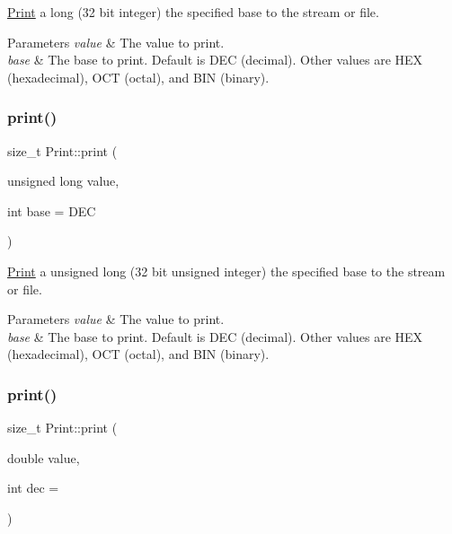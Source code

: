 \mbox{\hyperlink{class_print}{Print}} a long (32 bit integer) the specified base to the stream or file. 


\begin{DoxyParams}{Parameters}
{\em value} & The value to print. \\
\hline
{\em base} & The base to print. Default is D\+EC (decimal). Other values are H\+EX (hexadecimal), O\+CT (octal), and B\+IN (binary). \\
\hline
\end{DoxyParams}
\mbox{\label{class_print_acb8c6dcd4339b024436002aa9a6f4be2}} 
\subsubsection{\texorpdfstring{print()}{print()}\hspace{0.1cm}{\footnotesize\ttfamily [5/6]}}
{\footnotesize\ttfamily size\+\_\+t Print\+::print (\begin{DoxyParamCaption}\item[{unsigned long}]{value,  }\item[{int}]{base = {\ttfamily DEC} }\end{DoxyParamCaption})}



\mbox{\hyperlink{class_print}{Print}} a unsigned long (32 bit unsigned integer) the specified base to the stream or file. 


\begin{DoxyParams}{Parameters}
{\em value} & The value to print. \\
\hline
{\em base} & The base to print. Default is D\+EC (decimal). Other values are H\+EX (hexadecimal), O\+CT (octal), and B\+IN (binary). \\
\hline
\end{DoxyParams}
\mbox{\label{class_print_ad89472bdb6539423a42d350beec02ff4}} 
\subsubsection{\texorpdfstring{print()}{print()}\hspace{0.1cm}{\footnotesize\ttfamily [6/6]}}
{\footnotesize\ttfamily size\+\_\+t Print\+::print (\begin{DoxyParamCaption}\item[{double}]{value,  }\item[{int}]{dec = {} }\end{DoxyParamCaption})}



